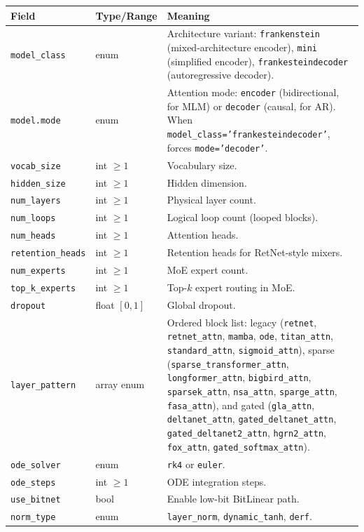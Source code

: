 \documentclass[11pt,a4paper]{article}
\begin{document}
\small
\begin{longtable}{p{5.1cm}p{2.4cm}p{7.0cm}}
\toprule
\textbf{Field} & \textbf{Type/Range} & \textbf{Meaning} \\
\midrule
\endhead
\texttt{model\_class} & enum & Architecture variant: \texttt{frankenstein} (mixed-architecture encoder), \texttt{mini} (simplified encoder), \texttt{frankesteindecoder} (autoregressive decoder). \\
\texttt{model.mode} & enum & Attention mode: \texttt{encoder} (bidirectional, for MLM) or \texttt{decoder} (causal, for AR). When \texttt{model\_class='frankesteindecoder'}, forces \texttt{mode='decoder'}. \\
\texttt{vocab\_size} & int $\ge 1$ & Vocabulary size. \\
\texttt{hidden\_size} & int $\ge 1$ & Hidden dimension. \\
\texttt{num\_layers} & int $\ge 1$ & Physical layer count. \\
\texttt{num\_loops} & int $\ge 1$ & Logical loop count (looped blocks). \\
\texttt{num\_heads} & int $\ge 1$ & Attention heads. \\
\texttt{retention\_heads} & int $\ge 1$ & Retention heads for RetNet-style mixers. \\
\texttt{num\_experts} & int $\ge 1$ & MoE expert count. \\
\texttt{top\_k\_experts} & int $\ge 1$ & Top-$k$ expert routing in MoE. \\
\texttt{dropout} & float $[0,1]$ & Global dropout. \\
\texttt{layer\_pattern} & array enum & Ordered block list: legacy (\texttt{retnet}, \texttt{retnet\_attn}, \texttt{mamba}, \texttt{ode}, \texttt{titan\_attn}, \texttt{standard\_attn}, \texttt{sigmoid\_attn}), sparse (\texttt{sparse\_transformer\_attn}, \texttt{longformer\_attn}, \texttt{bigbird\_attn}, \texttt{sparsek\_attn}, \texttt{nsa\_attn}, \texttt{sparge\_attn}, \texttt{fasa\_attn}), and gated (\texttt{gla\_attn}, \texttt{deltanet\_attn}, \texttt{gated\_deltanet\_attn}, \texttt{gated\_deltanet2\_attn}, \texttt{hgrn2\_attn}, \texttt{fox\_attn}, \texttt{gated\_softmax\_attn}). \\
\texttt{ode\_solver} & enum & \texttt{rk4} or \texttt{euler}. \\
\texttt{ode\_steps} & int $\ge 1$ & ODE integration steps. \\
\texttt{use\_bitnet} & bool & Enable low-bit BitLinear path. \\
\texttt{norm\_type} & enum & \texttt{layer\_norm}, \texttt{dynamic\_tanh}, \texttt{derf}. \\

\end{longtable}
\end{document}
